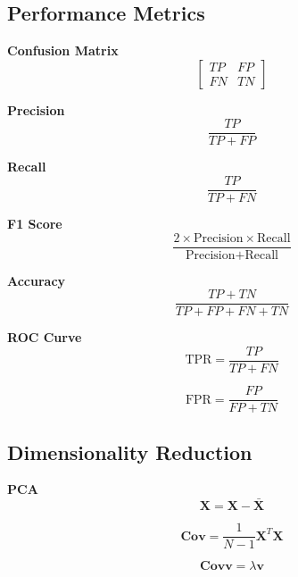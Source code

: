 \documentclass[8pt]{article}
\begin{document}
\begin{multicols}{2}
\subsection*{Performance Metrics}
\textbf{Confusion Matrix}
\begin{equation}
    \begin{bmatrix}
        TP & FP \\
        FN & TN
    \end{bmatrix}
\end{equation}

\textbf{Precision}
\begin{equation}
    \frac{TP}{TP + FP}
\end{equation}

\textbf{Recall}
\begin{equation}
    \frac{TP}{TP + FN}
\end{equation}

\textbf{F1 Score}
\begin{equation}
    \frac{2 \times \text{Precision} \times \text{Recall}}{\text{Precision} + \text{Recall}}
\end{equation}

\textbf{Accuracy}
\begin{equation}
    \frac{TP + TN}{TP + FP + FN + TN}
\end{equation}

\textbf{ROC Curve}
\begin{equation}
    \text{TPR} = \frac{TP}{TP + FN}
\end{equation}

\begin{equation}
    \text{FPR} = \frac{FP}{FP + TN}
\end{equation}

\subsection*{Dimensionality Reduction}
\textbf{PCA}
\begin{equation}
    \mathbf{X} = \mathbf{X} - \bar{\mathbf{X}}
\end{equation}

\begin{equation}
    \mathbf{Cov} = \frac{1}{N - 1} \mathbf{X}^T \mathbf{X}
\end{equation}

\begin{equation}
    \mathbf{Cov} \mathbf{v} = \lambda \mathbf{v}
\end{equation}

\end{multicols}
\end{document}
